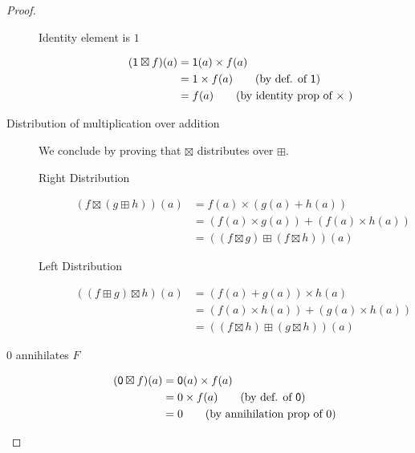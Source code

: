 \documentclass[runningheads]{llncs}
\begin{document}
\begin{proof}
\begin{description}
\begin{description}
				\item[Identity element is \(1\)]
					\begin{align*}
						(\mathsf{1} \boxtimes f)(a) & = \mathsf{1} (a) \times f(a)                    \\
						                            & = 1 \times f(a)\tag{by def. of \(\mathsf{1} \)} \\
						                            & = f(a) \tag{by identity prop of \(\times\) }
					\end{align*}
			\end{description}

		\item [Distribution of multiplication over addition]
		      We conclude by proving that \(\boxtimes \) distributes over \(\boxplus \).
		      \begin{description}
			      \item[Right Distribution]
				      \begin{align*}
					      (f \boxtimes (g \boxplus h))(a) & = f(a) \times (g(a) + h(a))                                                          \\
					                                      & = (f(a) \times g(a)) + (f(a) \times h(a)) \tag{by right distribution of \(\times \)} \\
					                                      & = ((f \boxtimes g) \boxplus (f \boxtimes h))(a)
				      \end{align*}

			      \item[Left Distribution]
				      \begin{align*}
					      ((f \boxplus g) \boxtimes h)(a) & = (f(a) + g(a)) \times h(a)                                                        \\
					                                      & = (f(a) \times h(a)) + (g(a) \times h(a))\tag{by left distribution of \(\times \)} \\
					                                      & = ((f \boxtimes h) \boxplus (g \boxtimes h))(a)
				      \end{align*}
		      \end{description}

		\item[\(0\) annihilates \(F\)]
			\begin{align*}
				(\mathsf{0} \boxtimes f)(a) & = \mathsf{0} (a) \times f(a)                     \\
				                            & = 0 \times f(a) \tag{by def. of \(\mathsf{0} \)} \\
				                            & = 0 \tag{by annihilation prop of \(0\)}
			\end{align*}


\end{description}
\end{proof}
\end{document}
